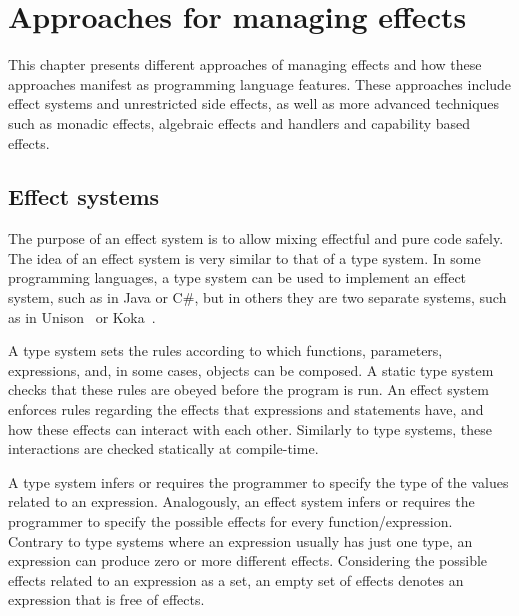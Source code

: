 \chapter{Approaches for managing effects}

This chapter presents different approaches of managing effects and how these approaches manifest as programming language features. These approaches include effect systems and unrestricted side effects, as well as more advanced techniques such as monadic effects, algebraic effects and handlers and capability based effects.


\section{Effect systems}\label{effect-systems}
The purpose of an effect system is to allow mixing effectful and pure code safely. The idea of an effect system is very similar to that of a type system. In some programming languages, a type system can be used to implement an effect system, such as in Java or C\#, but in others they are two separate systems, such as in Unison~\cite{unison-lang} or Koka~\cite{koka-lang}.

A type system sets the rules according to which functions, parameters, expressions, and, in some cases, objects can be composed. A static type system checks that these rules are obeyed before the program is run. An effect system enforces rules regarding the effects that expressions and statements have, and how these effects can interact with each other. Similarly to type systems, these interactions are checked statically at compile-time.

A type system infers or requires the programmer to specify the type of the values related to an expression. Analogously, an effect system infers or requires the programmer to specify the possible effects for every function/expression. Contrary to type systems where an expression usually has just one type, an expression can produce zero or more different effects. Considering the possible effects related to an expression as a set, an empty set of effects denotes an expression that is free of effects.

